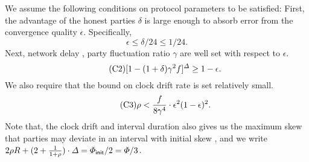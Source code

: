 We assume the following conditions on protocol parameters to be satisfied:
%
First, the advantage of the honest parties $\delta$ is large enough to absorb error from the convergence quality $\epsilon$.
%
Specifically,
%
\begin{equation} \tag{C1} \label{condition:error}
    \epsilon \le \delta / 24 \le 1 / 24.
\end{equation}
%
Next, network delay \delay, party fluctuation ratio $\gamma$ are well set with respect to $\epsilon$.
%
\begin{equation} \tag{C2} \label{condition:mining-rate}
    [1 - (1 + \delta)\gamma^2 f]^\varDelta \ge 1 - \epsilon.
\end{equation}
%
We also require that the bound on clock drift rate \clockDrift is set relatively small.
%
\begin{equation} \tag{C3} \label{condition:clock-drift}
    \rho < \frac{f}{8 \gamma^4} \cdot \epsilon^2(1 - \epsilon)^2.
\end{equation}
%
Note that, the clock drift \maxSkew and interval duration \syncLen also gives us the maximum skew that parties may deviate in an interval with initial skew \initSkew, and we write $2 \rho R + (2 + \frac{1}{1 + \rho}) \cdot \varDelta = \varPhi_{\mathsf{init}} / 2 = \varPhi / 3$.
